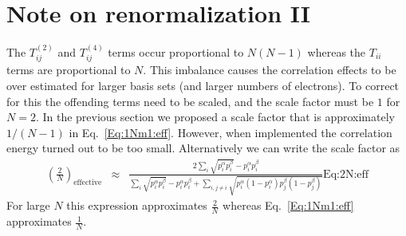 \documentclass[pra,nofootinbib]{revtex4-1}
\newcommand{\dlabel}[1]{\text{#1}\label{#1}}
\begin{document}
\section{Note on renormalization II}

The $T^{(2)}_{ij}$ and $T^{(4)}_{ij}$ terms occur proportional to $N(N-1)$ whereas
the $T_{ii}$ terms are proportional to $N$. This imbalance causes the correlation
effects to be over estimated for larger basis sets (and larger numbers of electrons).
To correct for this the offending terms need to be scaled, and the scale factor must
be $1$ for $N=2$. In the previous section we proposed a scale factor that is 
approximately $1/(N-1)$ in Eq.~\ref{Eq:1Nm1:eff}. However, when implemented the
correlation energy turned out to be too small. Alternatively we can write the
scale factor as
\begin{eqnarray}
   \left(\frac{2}{N}\right)_\mathrm{effective}
   &\approx&
   \frac{2\sum_{i}\sqrt{p^\alpha_i p^\beta_i}-p^\alpha_i p^\beta_i}
        { \sum_{i}\sqrt{p^\alpha_i p^\beta_i}-p^\alpha_i p^\beta_i
         +\sum_{i,j\ne i}\sqrt{p^\alpha_i(1-p^\alpha_i)p^\beta_j(1-p^\beta_j)}}
  \dlabel{Eq:2N:eff}
\end{eqnarray}
For large $N$ this expression approximates $\frac{2}{N}$ whereas Eq.~\ref{Eq:1Nm1:eff}
approximates $\frac{1}{N}$.
\end{document}
